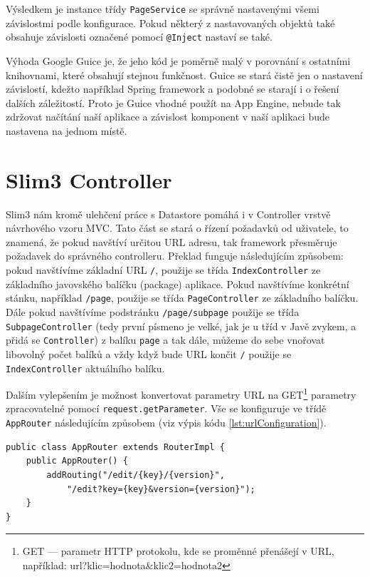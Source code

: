 Výsledkem je instance třídy \verb|PageService| se správně nastavenými všemi závislostmi podle konfigurace. Pokud některý z nastavovaných objektů  také obsahuje závislosti označené pomocí \verb|@Inject| nastaví se také.

Výhoda Google Guice je, že jeho kód je poměrně malý v porovnání s ostatními knihovnami, které obsahují stejnou funkčnost. Guice se stará čistě jen o nastavení závislostí, kdežto například Spring framework a podobné se starají i o řešení dalších záležitostí. Proto je Guice vhodné použít na App Engine, nebude tak zdržovat načítání naší aplikace a závislost komponent v naší aplikaci bude nastavena na jednom místě.

\section{Slim3 Controller}
Slim3 nám kromě ulehčení práce s Datastore pomáhá i v Controller vrstvě návrhového vzoru MVC. Tato část se stará o řízení požadavků od uživatele, to znamená, že pokud navštíví určitou URL adresu, tak framework přesměruje požadavek do správného controlleru. Překlad funguje následujícím způsobem: pokud navštívíme základní URL \verb|/|, použije se třída \verb|IndexController| ze základního javovského balíčku (package) aplikace. Pokud navštívíme konkrétní stánku, například \verb|/page|, použije se třída \verb|PageController| ze základního balíčku. Dále pokud navštívíme podstránku \verb|/page/subpage| použije se třída \verb|SubpageController|  (tedy první písmeno je velké, jak je u tříd v Javě zvykem, a přidá se \verb|Controller|) z balíku \verb|page| a tak dále, můžeme do sebe vnořovat libovolný počet balíků a vždy když bude URL končit \verb|/| použije se \verb|IndexController| aktuálního balíku. 

Dalším vylepšením je možnost konvertovat parametry URL na GET\footnote{GET --- parametr HTTP protokolu, kde se proměnné přenášejí v URL, například: url?klic=hodnota\&klic2=hodnota2} parametry zpracovatelné pomocí \verb|request.getParameter|. Vše se konfiguruje ve třídě \verb|AppRouter| následujícím způsobem (viz výpis kódu \ref{lst:urlConfiguration}).

\begin{lstlisting}[caption={Konfigurace nastaveníURL},label=lst:urlConfiguration,belowcaptionskip=0.4cm]
public class AppRouter extends RouterImpl {
	public AppRouter() {
		addRouting("/edit/{key}/{version}", 
			"/edit?key={key}&version={version}");
	}
}
\end{lstlisting}

